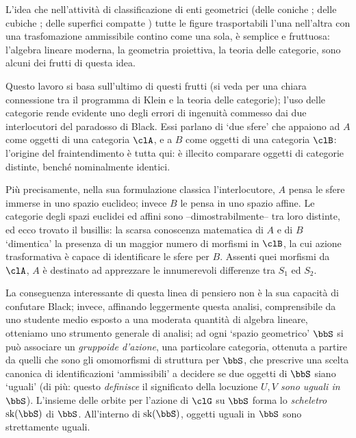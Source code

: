L'idea che nell'attività di classificazione di enti geometrici (delle coniche \cite{}; delle cubiche \cite{}; delle superfici compatte \cite{}) tutte le figure trasportabili l'una nell'altra con una trasfomazione ammissibile contino come una sola, è semplice e fruttuosa: l'algebra lineare moderna, la geometria proiettiva, la teoria delle categorie, sono alcuni dei frutti di questa idea.

Questo lavoro si basa sull'ultimo di questi frutti (si veda \cite[??]{foo} per una chiara connessione tra il programma di Klein e la teoria delle categorie); l'uso delle categorie rende evidente uno degli errori di ingenuità commesso dai due interlocutori del paradosso di Black. Essi parlano di `due sfere' che appaiono ad $A$ come oggetti di una categoria $\clA$, e a $B$ come oggetti di una categoria $\clB$: l'origine del fraintendimento è tutta qui: è illecito comparare oggetti di categorie distinte, benché nominalmente identici.

Più precisamente, nella sua formulazione classica l'interlocutore, $A$ pensa le sfere immerse in uno spazio euclideo; invece $B$ le pensa in uno spazio affine. Le categorie degli spazi euclidei ed affini sono --dimostrabilmente-- tra loro distinte, ed ecco trovato il busillis: la scarsa conoscenza matematica di $A$ e di $B$ `dimentica' la presenza di un maggior numero di morfismi in $\clB$, la cui azione trasformativa è capace di identificare le sfere per $B$. Assenti quei morfismi da $\clA$, $A$ è destinato ad apprezzare le innumerevoli differenze tra $S_1$ ed $S_2$.

La conseguenza interessante di questa linea di pensiero non è la sua capacità di confutare Black; invece, affinando leggermente questa analisi, comprensibile da uno studente medio esposto a una moderata quantità di algebra lineare, otteniamo uno strumento generale di analisi; ad ogni `spazio geometrico' $\bbS$ si può associare un \emph{gruppoide d'azione}, una particolare categoria, ottenuta a partire da quelli che sono gli omomorfismi di struttura per $\bbS$, che prescrive una scelta canonica di identificazioni `ammissibili' a decidere se due oggetti di $\bbS$ siano `uguali' (di più: questo \emph{definisce} il significato della locuzione \emph{$U,V$ sono uguali in $\bbS$}). L'insieme delle orbite per l'azione di $\clG$ su $\bbS$ forma lo \emph{scheletro} $\text{sk}(\bbS)$ di $\bbS$. All'interno di $\text{sk}(\bbS)$, oggetti uguali in $\bbS$ sono strettamente uguali.

